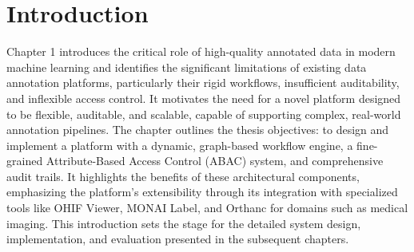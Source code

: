 \chapter{Introduction}
\label{sec:Introduction}
\label{Chapter1}

\begin{ChapAbstract}
Chapter 1 introduces the critical role of high-quality annotated data in modern machine learning and identifies the significant limitations of existing data annotation platforms, particularly their rigid workflows, insufficient auditability, and inflexible access control. It motivates the need for a novel platform designed to be flexible, auditable, and scalable, capable of supporting complex, real-world annotation pipelines. The chapter outlines the thesis objectives: to design and implement a platform with a dynamic, graph-based workflow engine, a fine-grained Attribute-Based Access Control (ABAC) system, and comprehensive audit trails. It highlights the benefits of these architectural components, emphasizing the platform's extensibility through its integration with specialized tools like OHIF Viewer, MONAI Label, and Orthanc for domains such as medical imaging. This introduction sets the stage for the detailed system design, implementation, and evaluation presented in the subsequent chapters.
\end{ChapAbstract}






